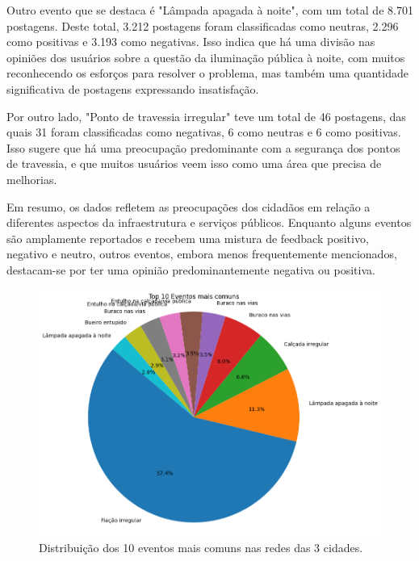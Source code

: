 Outro evento que se destaca é "Lâmpada apagada à noite", com um total de 8.701 postagens. Deste total, 3.212 postagens foram classificadas como neutras, 2.296 como positivas e 3.193 como negativas. Isso indica que há uma divisão nas opiniões dos usuários sobre a questão da iluminação pública à noite, com muitos reconhecendo os esforços para resolver o problema, mas também uma quantidade significativa de postagens expressando insatisfação.

Por outro lado, "Ponto de travessia irregular" teve um total de 46 postagens, das quais 31 foram classificadas como negativas, 6 como neutras e 6 como positivas. Isso sugere que há uma preocupação predominante com a segurança dos pontos de travessia, e que muitos usuários veem isso como uma área que precisa de melhorias.

Em resumo, os dados refletem as preocupações dos cidadãos em relação a diferentes aspectos da infraestrutura e serviços públicos. Enquanto alguns eventos são amplamente reportados e recebem uma mistura de feedback positivo, negativo e neutro, outros eventos, embora menos frequentemente mencionados, destacam-se por ter uma opinião predominantemente negativa ou positiva.

\begin{figure}[!htb]
	\caption{Distribuição dos 10 eventos mais comuns nas redes das 3 cidades.}
	\label{fig:pie_most_common_events}
	\centering
	\includegraphics[scale=0.75]{images/pie_most_common_events.png}
	\fautor
\end{figure}

